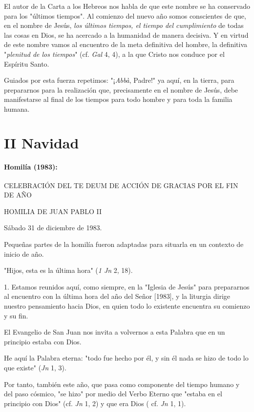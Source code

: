 El autor de la Carta a los Hebreos nos habla de que este nombre se ha
conservado para los "últimos tiempos". Al comienzo del nuevo año somos
conscientes de que, en el nombre de Jesús, \emph{los últimos tiempos, el
	tiempo del cumplimiento} de todas las cosas en Dios, se ha acercado a la
humanidad de manera decisiva. Y en virtud de este nombre vamos al
encuentro de la meta definitiva del hombre, la definitiva
"\emph{plenitud de los tiempos}" (cf. \emph{Gal} 4, 4), a la que Cristo
nos conduce por el Espíritu Santo.

Guiados por esta fuerza repetimos: "¡\emph{Abbà}, Padre!" ya aquí, en la
tierra, para prepararnos para la realización que, precisamente en el
nombre de Jesús, debe manifestarse al final de los tiempos para todo
hombre y para toda la familia humana.





\chapter{II Navidad}

\subsubsection{Homilía (1983): }

CELEBRACIÓN DEL TE DEUM DE ACCIÓN DE GRACIAS POR EL FIN DE AÑO

HOMILIA DE JUAN PABLO II

Sábado 31 de diciembre de 1983.

Pequeñas partes de la homilía fueron adaptadas para situarla en un
contexto de inicio de año.

"Hijos, esta es la última hora" (\emph{1 Jn} 2, 18).

1. Estamos reunidos aquí, como siempre, en la "Iglesia de Jesús" para
prepararnos al encuentro con la última hora del año del Señor
{[}1983{]}, y la liturgia dirige nuestro pensamiento hacia Dios, en
quien todo lo existente encuentra su comienzo y su fin.

El Evangelio de San Juan nos invita a volvernos a esta Palabra que en un
principio estaba con Dios.

He aquí la Palabra eterna: "todo fue hecho por él, y sin él nada se hizo
de todo lo que existe" (\emph{Jn} 1, 3).

Por tanto, también este año, que pasa como componente del tiempo humano
y del paso cósmico, "se hizo" por medio del Verbo Eterno que "estaba en
el principio con Dios" (cf. \emph{Jn} 1, 2) y que era Dios ( cf.
\emph{Jn} 1, 1).

